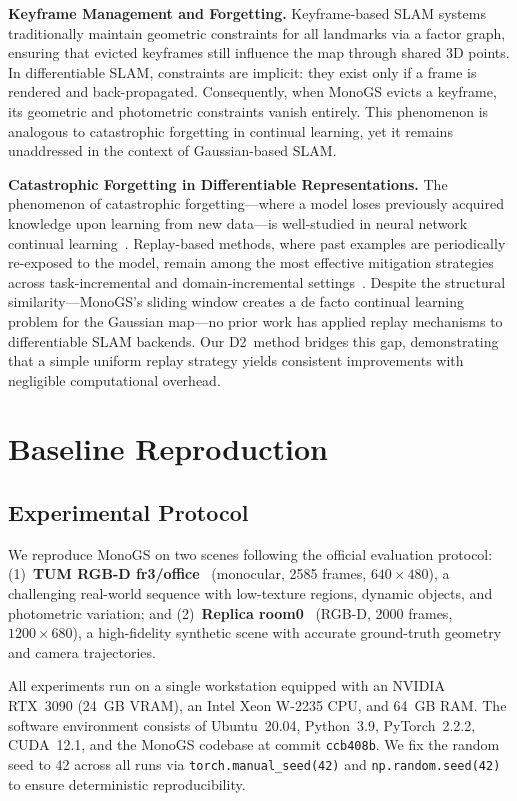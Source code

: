 \documentclass[conference]{IEEEtran}
\begin{document}
\textbf{Keyframe Management and Forgetting.}
Keyframe-based SLAM systems~\cite{orbslam2} traditionally maintain geometric constraints for all landmarks via a factor graph, ensuring that evicted keyframes still influence the map through shared 3D points.
In differentiable SLAM, constraints are implicit: they exist only if a frame is rendered and back-propagated.
Consequently, when MonoGS evicts a keyframe, its geometric and photometric constraints vanish entirely.
This phenomenon is analogous to catastrophic forgetting in continual learning, yet it remains unaddressed in the context of Gaussian-based SLAM.

\textbf{Catastrophic Forgetting in Differentiable Representations.}
The phenomenon of catastrophic forgetting---where a model loses previously acquired knowledge upon learning from new data---is well-studied in neural network continual learning~\cite{kirkpatrick2017ewc, chaudhry2019tiny}.
Replay-based methods, where past examples are periodically re-exposed to the model, remain among the most effective mitigation strategies across task-incremental and domain-incremental settings~\cite{buzzega2020dark}.
Despite the structural similarity---MonoGS's sliding window creates a de facto continual learning problem for the Gaussian map---no prior work has applied replay mechanisms to differentiable SLAM backends.
Our {D2}~method bridges this gap, demonstrating that a simple uniform replay strategy yields consistent improvements with negligible computational overhead.

\section{Baseline Reproduction}
\label{sec:baseline}

\subsection{Experimental Protocol}

We reproduce MonoGS on two scenes following the official evaluation protocol: (1)~\textbf{TUM RGB-D fr3/office}~\cite{tum} (monocular, 2585 frames, $640 \times 480$), a challenging real-world sequence with low-texture regions, dynamic objects, and photometric variation; and (2)~\textbf{Replica room0}~\cite{replica} (RGB-D, 2000 frames, $1200 \times 680$), a high-fidelity synthetic scene with accurate ground-truth geometry and camera trajectories.

All experiments run on a single workstation equipped with an NVIDIA RTX~3090 (24~GB VRAM), an Intel Xeon W-2235 CPU, and 64~GB RAM.
The software environment consists of Ubuntu~20.04, Python~3.9, PyTorch~2.2.2, CUDA~12.1, and the MonoGS codebase at commit \texttt{ccb408b}.
We fix the random seed to 42 across all runs via \texttt{torch.manual\_seed(42)} and \texttt{np.random.seed(42)} to ensure deterministic reproducibility.
\end{document}
